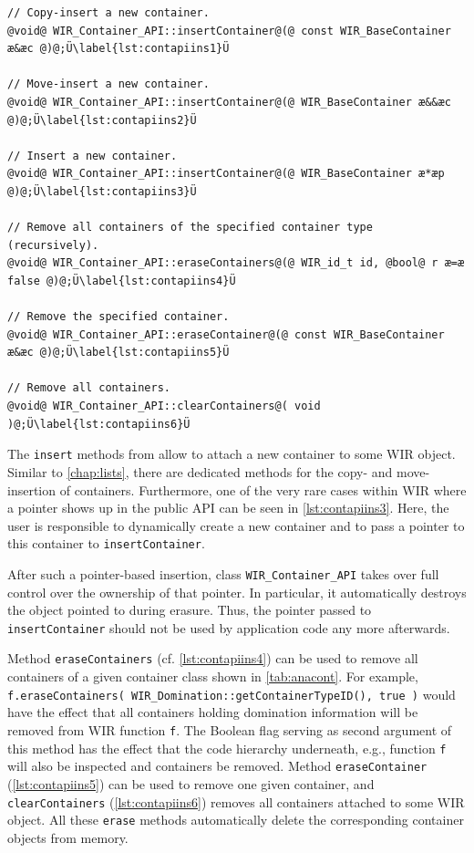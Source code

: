 \begin{lstlisting}[style=code,float=!b,caption={Insertion and Removal of WIR Containers},label=lst:contapiins]
// Copy-insert a new container.
@void@ WIR_Container_API::insertContainer@(@ const WIR_BaseContainer æ&æc @)@;Ü\label{lst:contapiins1}Ü

// Move-insert a new container.
@void@ WIR_Container_API::insertContainer@(@ WIR_BaseContainer æ&&æc @)@;Ü\label{lst:contapiins2}Ü

// Insert a new container.
@void@ WIR_Container_API::insertContainer@(@ WIR_BaseContainer æ*æp @)@;Ü\label{lst:contapiins3}Ü

// Remove all containers of the specified container type (recursively).
@void@ WIR_Container_API::eraseContainers@(@ WIR_id_t id, @bool@ r æ=æ false @)@;Ü\label{lst:contapiins4}Ü

// Remove the specified container.
@void@ WIR_Container_API::eraseContainer@(@ const WIR_BaseContainer æ&æc @)@;Ü\label{lst:contapiins5}Ü

// Remove all containers.
@void@ WIR_Container_API::clearContainers@( void )@;Ü\label{lst:contapiins6}Ü
\end{lstlisting}

The \texttt{insert} methods from  allow to attach a new container to some \gls{WIR} object.
Similar to \cref{chap:lists}, there are dedicated methods for the copy- and move-insertion of containers.
Furthermore, one of the very rare cases within \gls{WIR} where a pointer shows up in the public \gls{API} can be seen in \cref{lst:contapiins3}.
Here, the user is responsible to dynamically create a new container and to pass a pointer to this container to \texttt{insertContainer}.

\begin{wirWarn}
  After such a pointer-based insertion, class \texttt{WIR\_Container\_API} takes over full control over the ownership of that pointer.
  In particular, it automatically destroys the object pointed to during erasure.
  Thus, the pointer passed to \texttt{insertContainer} should not be used by application code any more afterwards.
\end{wirWarn}

Method \texttt{eraseContainers} (cf. \cref{lst:contapiins4}) can be used to remove all containers of a given container class shown in \cref{tab:anacont}.
For example, \texttt{f.eraseContainers( WIR\_Domination::getContainerTypeID(), true )} would have the effect that all containers holding domination information will be removed from \gls{WIR} function \texttt{f}.
The Boolean flag serving as second argument of this method has the effect that the code hierarchy underneath, e.g., function \texttt{f} will also be inspected and containers be removed.
Method \texttt{eraseContainer} (\cref{lst:contapiins5}) can be used to remove one given container, and \texttt{clearContainers} (\cref{lst:contapiins6}) removes all containers attached to some \gls{WIR} object.
All these \texttt{erase} methods automatically delete the corresponding container objects from memory.

